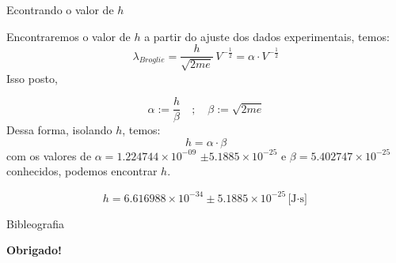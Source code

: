 \documentclass[aspectratio=169,12.5pt,xcolor=dvipsnames]{beamer}
\begin{document}
\begin{frame}{Econtrando o valor de $h$}

Encontraremos o valor de $h$ a partir do ajuste dos dados experimentais, temos:
\begin{equation}
\lambda_{Broglie} = \frac{h}{\sqrt{2 m e}} \, V^{-\tfrac{1}{2}} = \alpha \cdot V^{-\tfrac{1}{2}}
\end{equation}
\indent Isso posto,

\begin{equation}
\alpha := \frac{h}{\beta} \quad ; \quad \beta := \sqrt{2 m e}
\end{equation}
\indent Dessa forma, isolando $h$, temos:
\begin{equation}
h = \alpha \cdot \beta
\end{equation}
com os valores de $\alpha = 1.224744 \times 10^{-09}$ $\pm 5.1885 \times 10^{-25}
$ e $\beta = 5.402747 \times 10^{-25}$ conhecidos, podemos encontrar $h$.

\begin{equation}
        h =  6.616988 \times 10^{-34} \pm 5.1885 \times 10^{-25} \text{[J$\cdot$s]}
\end{equation}

\end{frame}



\begin{frame}{Bibleografia}
    \footnotesize
    
    
\end{frame}


\begin{frame}
    \Huge{\centerline{\textbf{Obrigado!}}}
\end{frame}

\end{document}

